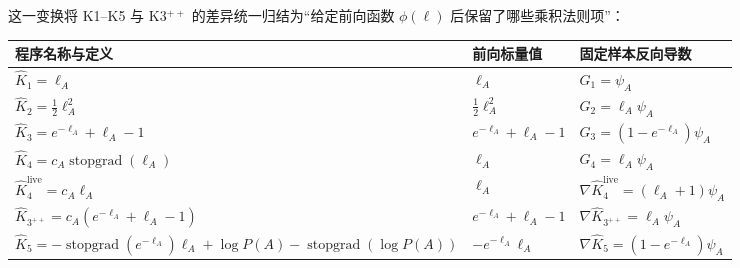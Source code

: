 \documentclass[lang=cn,scheme=chinese,openany]{elegantbook}
\newcommand{\sg}{\operatorname{stopgrad}}
\begin{document}
这一变换将 K1--K5 与 K3$^{++}$ 的差异统一归结为“给定前向函数 $\phi(\ell)$ 后保留了哪些乘积法则项”：
\begin{center}
\begin{tabular}{lll}
\toprule
程序名称与定义 & 前向标量值 & 固定样本反向导数\\
\midrule
$\widehat K_1=\ell_A$ & $\ell_A$ & $G_1=\psi_A$\\
$\widehat K_2=\frac12\ell_A^2$ & $\frac12\ell_A^2$ & $G_2=\ell_A\psi_A$\\
$\widehat K_3=e^{-\ell_A}+\ell_A-1$ & $e^{-\ell_A}+\ell_A-1$ & $G_3=(1-e^{-\ell_A})\psi_A$\\
$\widehat K_4=c_A\sg(\ell_A)$ & $\ell_A$ & $G_4=\ell_A\psi_A$\\
$\widehat K_4^{\mathrm{live}}=c_A\ell_A$ & $\ell_A$ & $\nabla\widehat K_4^{\mathrm{live}}=(\ell_A+1)\psi_A$\\
$\widehat K_{3^{++}}=c_A(e^{-\ell_A}+\ell_A-1)$ & $e^{-\ell_A}+\ell_A-1$ & $\nabla\widehat K_{3^{++}}=\ell_A\psi_A$\\
$\widehat K_5=-\sg(e^{-\ell_A})\ell_A+\log P(A)-\sg(\log P(A))$ & $-e^{-\ell_A}\ell_A$ & $\nabla\widehat K_5=(1-e^{-\ell_A})\psi_A$\\
\bottomrule
\end{tabular}
\end{center}
\end{document}
